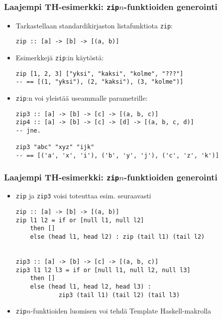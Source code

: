 \documentclass{beamer}
\begin{document}
\begin{frame}[fragile]
\frametitle{Laajempi TH-esimerkki: \texttt{zip$n$}-funktioiden generointi}

\begin{itemize}
\item{Tarkastellaan standardikirjaston listafunktiota \texttt{zip}:}
\begin{verbatim}
zip :: [a] -> [b] -> [(a, b)]
\end{verbatim}
\item{Esimerkkejä \texttt{zip}:in käytöstä:}
\begin{verbatim}
zip [1, 2, 3] ["yksi", "kaksi", "kolme", "???"]
-- == [(1, "yksi"), (2, "kaksi"), (3, "kolme")]
\end{verbatim}

\item{\texttt{zip}:n voi yleistää useammalle parametrille:}
\begin{verbatim}
zip3 :: [a] -> [b] -> [c] -> [(a, b, c)]
zip4 :: [a] -> [b] -> [c] -> [d] -> [(a, b, c, d)]
-- jne.

zip3 "abc" "xyz" "ijk"
-- == [('a', 'x', 'i'), ('b', 'y', 'j'), ('c', 'z', 'k')]
\end{verbatim}
\end{itemize}

\end{frame}

\begin{frame}[fragile]
\frametitle{Laajempi TH-esimerkki: \texttt{zip$n$}-funktioiden generointi}

\begin{itemize}
\item{\texttt{zip} ja \texttt{zip3} voisi toteuttaa esim. seuraavasti}

\begin{verbatim}
zip :: [a] -> [b] -> [(a, b)]
zip l1 l2 = if or [null l1, null l2]
    then []
    else (head l1, head l2) : zip (tail l1) (tail l2)


zip3 :: [a] -> [b] -> [c] -> [(a, b, c)]
zip3 l1 l2 l3 = if or [null l1, null l2, null l3]
    then []
    else (head l1, head l2, head l3) :
            zip3 (tail l1) (tail l2) (tail l3)
\end{verbatim}

\item{\texttt{zip$n$}-funktioiden luomisen voi tehdä Template Haskell-makrolla}
\end{itemize}
\end{frame}
\end{document}
